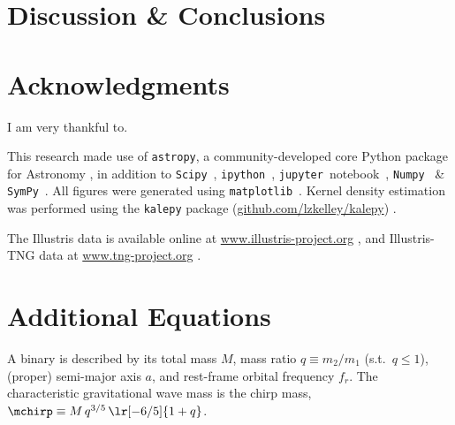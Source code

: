 

\section{Discussion \& Conclusions}
    \label{sec:disc}







\section*{Acknowledgments}
	I am very thankful to.

    This research made use of \texttt{astropy}, a community-developed core Python package for Astronomy \citep{astropy2013}, in addition to \texttt{Scipy}~\citep{scipy}, \texttt{ipython}~\citep{ipython}, \texttt{jupyter}~notebook~\citep{jupyter}, \texttt{Numpy}~\citep{numpy2011} \& \texttt{SymPy}~\citep{sympy2017}.  All figures were generated using \texttt{matplotlib}~\citep{matplotlib2007}.  Kernel density estimation was performed using the \texttt{kalepy}{} package (\href{https://github.com/lzkelley/kalepy}{github.com/lzkelley/kalepy}) \citep{kalepy2020}.

    The Illustris data is available online at \href{https://www.illustris-project.org/}{www.illustris-project.org} \citep{Nelson+2015}, and Illustris-TNG data at \href{https://www.tng-project.org/}{www.tng-project.org} \citep{Nelson+2019}.



\let\oldUrl\url
\renewcommand{\url}[1]{\href{#1}{Link}}

\quad{}



\onecolumn
\clearpage



\appendix


\section{Additional Equations}
    \label{sec:app_eqs}
    A binary is described by its total mass $M$, mass ratio $q \equiv m_2 / m_1$ (s.t.~$q\leq1$), (proper) semi-major axis $a$, and rest-frame orbital frequency $f_r$.  The characteristic gravitational wave mass is the chirp mass, $\mchirp \equiv M \, q^{3/5} \, \lr[-6/5]{1+q}$.

